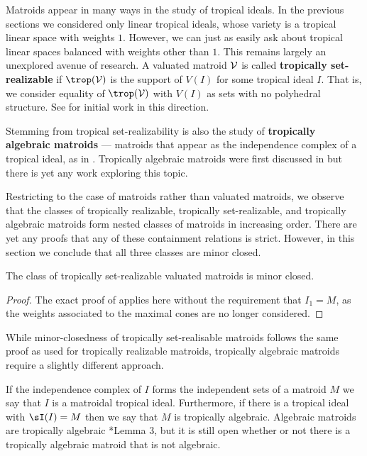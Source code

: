     Matroids appear in many ways in the study of tropical ideals. In the previous sections we considered only linear tropical ideals, whose variety is a tropical linear space with weights $1$. However, we can just as easily ask about tropical linear spaces balanced with weights other than $1$. This remains largely an unexplored avenue of research. A valuated matroid $\mathcal{V}$ is called \textbf{tropically set-realizable} if $\trop(\sV)$ is the support of $V(I)$ for some tropical ideal $I$. That is, we consider equality of $\trop(\sV)$ with $V(I)$ as sets with no polyhedral structure. See \cite{Yu17} for initial work in this direction. 
    
    Stemming from tropical set-realizability is also the study of \textbf{tropically algebraic matroids} --- matroids that appear as the independence complex of a tropical ideal, as in . Tropically algebraic matroids were first discussed in \cite{DR19} but there is yet any work exploring this topic.
    
    Restricting to the case of matroids rather than valuated matroids, we observe that the classes of tropically realizable, tropically set-realizable, and tropically algebraic matroids form nested classes of matroids in increasing order. There are yet any proofs that any of these containment relations is strict. However, in this section we conclude that all three classes are minor closed.

\begin{proposition}
The class of tropically set-realizable valuated matroids is minor closed.
\end{proposition}
\begin{proof}
The exact proof of  applies here without the requirement that $I_1=M$, as the weights associated to the maximal cones are no longer considered.
\end{proof}

While minor-closedness of tropically set-realisable matroids follows the same proof as used for tropically realizable matroids, tropically algebraic matroids require a slightly different approach.

If the independence complex of $I$ forms the independent sets of a matroid $M$ we say that $I$ is a matroidal tropical ideal. Furthermore, if there is a tropical ideal with $\sI(I)=M$ then we say that $M$ is tropically algebraic. Algebraic matroids are tropically algebraic \cite{Yu17}*{Lemma 3}, but it is still open whether or not there is a tropically algebraic matroid that is not algebraic.

